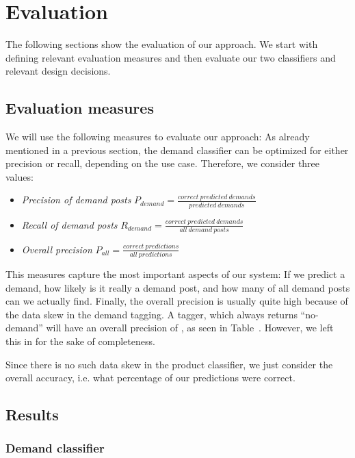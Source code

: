 
\section{Evaluation}
\label{sec:evaluation}

The following sections show the evaluation of our approach.
We start with defining relevant evaluation measures and then evaluate our two classifiers and relevant design decisions.

\subsection{Evaluation measures}
\label{sub:evaluation_measures}
We will use the following measures to evaluate our approach:
As already mentioned in a previous section, the demand classifier can be optimized for either precision or recall, depending on the use case.
Therefore, we consider three values:
\begin{itemize}
	\item
		\emph{Precision of demand posts}
		$P_{demand} = \frac{correct~predicted~demands}{predicted~demands}$
	\item
		\emph{Recall of demand posts}
		$R_{demand} = \frac{correct~predicted~demands}{all~demand~posts}$
	\item
		\emph{Overall precision}
		$P_{all} = \frac{correct~predictions}{all~predictions}$
\end{itemize}
This measures capture the most important aspects of our system: If we predict a demand, how likely is it really a demand post, and how many of all demand posts can we actually find.
Finally, the overall precision is usually quite high because of the data skew in the demand tagging.
A tagger, which always returns ``no-demand'' will have an overall precision of , as seen in Table~.
However, we left this in for the sake of completeness.

Since there is no such data skew in the product classifier, we just consider the overall accuracy, i.e. what percentage of our predictions were correct.


\subsection{Results}
\label{sub:results}

\subsubsection{Demand classifier}
\label{ssub:demand_classifier}


